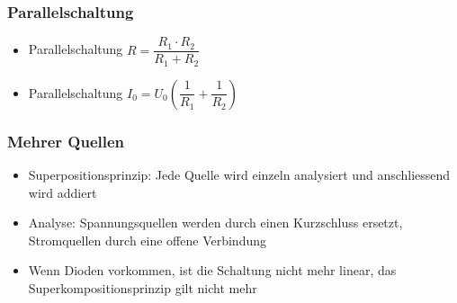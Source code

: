 \documentclass[8pt,a4paper]{scrartcl}
\begin{document}
\begin{multicols*}{3}
				\subsubsection{Parallelschaltung}	
					\begin{itemize}\itemsep0pt
						\item Parallelschaltung $R=\dfrac{R_{1} \cdot R_{2}}{R_{1} + R_{2}}$
						\item Parallelschaltung $I_{0}=U_{0}(\dfrac{1}{R_{1}} + \dfrac{1}{R_{2}})$
					\end{itemize}
					
				\subsubsection{Mehrer Quellen}	
					\begin{itemize}\itemsep0pt
						\item Superpositionsprinzip: Jede Quelle wird einzeln analysiert und anschliessend wird addiert
						\item Analyse: Spannungsquellen werden durch einen Kurzschluss ersetzt, Stromquellen durch eine offene Verbindung
						\item Wenn Dioden vorkommen, ist die Schaltung nicht mehr linear, das Superkompositionsprinzip gilt nicht mehr
					\end{itemize}
			
			

\end{multicols*}
\end{document}
